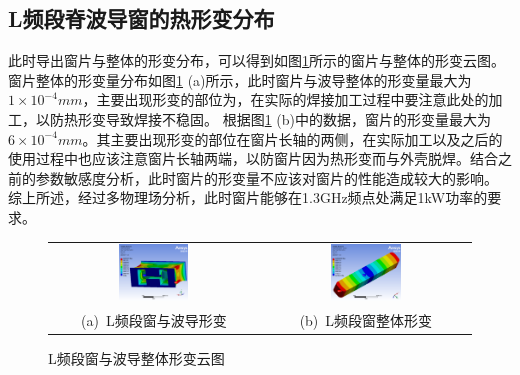 \documentclass[master]{thesis-uestc}
\begin{document}
\subsection{L频段脊波导窗的热形变分布}
此时导出窗片与整体的形变分布，可以得到如图\ref{fig:L频段窗与整体形变}所示的窗片与整体的形变云图。
窗片整体的形变量分布如图\ref{fig:L频段窗与整体形变} (a)所示，此时窗片与波导整体的形变量最大为\(1 \times 10 ^{-4}mm\)，主要出现形变的部位为，在实际的焊接加工过程中要注意此处的加工，以防热形变导致焊接不稳固。
根据图\ref{fig:L频段窗与整体形变} (b)中的数据，窗片的形变量最大为\(6 \times 10 ^{-4}mm\)。其主要出现形变的部位在窗片长轴的两侧，在实际加工以及之后的使用过程中也应该注意窗片长轴两端，以防窗片因为热形变而与外壳脱焊。结合之前的参数敏感度分析，此时窗片的形变量不应该对窗片的性能造成较大的影响。
综上所述，经过多物理场分析，此时窗片能够在1.3GHz频点处满足1kW功率的要求。
\begin{figure}[!htb]
    \small
    \centering
    \begin{tabular}{@{\ }c@{\ }c}
        \includegraphics[width=0.35\textwidth]{pic/chapter4/L频段整体形变.png} & 
        \hspace{5pt}
        \includegraphics[width=0.35\textwidth]{pic/chapter4/L频段窗形变.png}     \\
        \mbox{\small (a) L频段窗与波导形变}                                                                               & 
        \mbox{\small (b) L频段窗整体形变}                                                                                  \\
    \end{tabular}
    \caption{L频段窗与波导整体形变云图}
    \label{fig:L频段窗与整体形变}
\end{figure}
\end{document}
